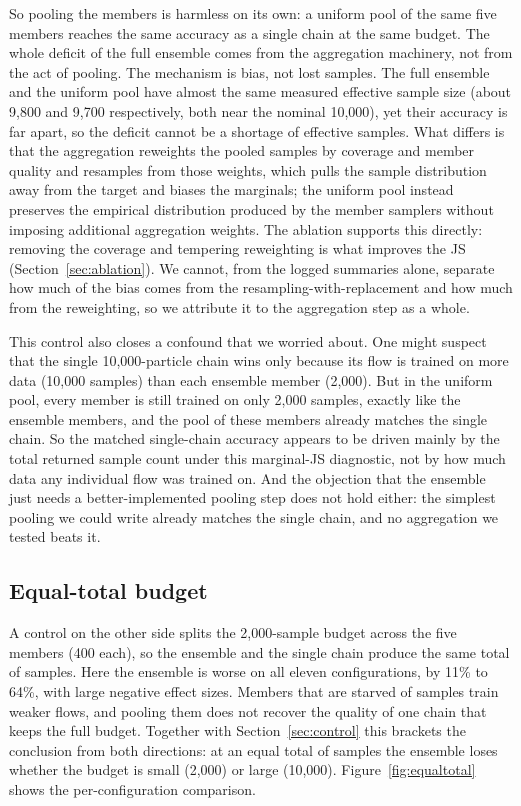 \documentclass[11pt]{article}
\begin{document}
So pooling the members is harmless on its own: a uniform pool of the same five
members reaches the same accuracy as a single chain at the same budget. The
whole deficit of the full ensemble comes from the aggregation machinery, not
from the act of pooling. The mechanism is bias, not lost samples. The full ensemble and the uniform
pool have almost the same measured effective sample size (about 9,800 and 9,700
respectively, both near the nominal 10,000), yet their accuracy is far apart, so
the deficit cannot be a shortage of effective samples. What differs is that the
aggregation reweights the pooled samples by coverage and member quality and
resamples from those weights, which pulls the sample distribution away from the
target and biases the marginals; the uniform pool instead
preserves the empirical distribution produced by the member samplers without
imposing additional aggregation weights. The ablation supports
this directly: removing the coverage and tempering reweighting is what improves
the JS (Section~\ref{sec:ablation}). We cannot, from the logged summaries
alone, separate how much of the bias comes from the resampling-with-replacement
and how much from the reweighting, so we attribute it to the aggregation step as
a whole.

This control also closes a confound that we worried about. One might suspect
that the single 10,000-particle chain wins only because its flow is trained on
more data (10,000 samples) than each ensemble member (2,000). But in the
uniform pool, every member is still trained on only 2,000 samples, exactly like
the ensemble members, and the pool of these members already matches the single
chain. So the matched single-chain accuracy appears to be driven mainly by the total
returned sample count under this marginal-JS diagnostic, not by how much data
any individual flow was trained on. And
the objection that the ensemble just needs a better-implemented pooling step
does not hold either: the simplest pooling we could write already matches the
single chain, and no aggregation we tested beats it.

\subsection{Equal-total budget}
A control on the other side splits the 2,000-sample budget across the five
members (400 each), so the ensemble and the single chain produce the same total
of samples. Here the ensemble is worse on all eleven configurations, by 11\% to
64\%, with large negative effect sizes. Members that are starved of samples
train weaker flows, and pooling them does not recover the quality of one chain
that keeps the full budget. Together with Section~\ref{sec:control} this
brackets the conclusion from both directions: at an equal total of samples the
ensemble loses whether the budget is small (2,000) or large (10,000).
Figure~\ref{fig:equaltotal} shows the per-configuration comparison.
\end{document}
